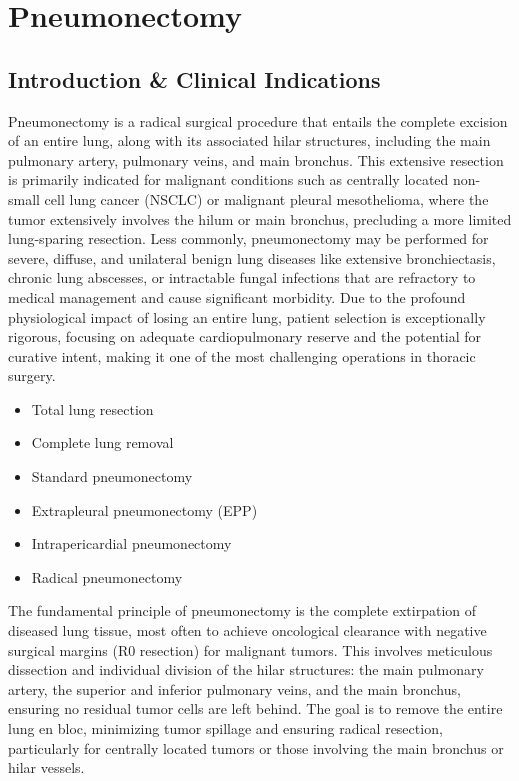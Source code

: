 \chapter{Pneumonectomy}

\section*{Introduction \& Clinical Indications}
Pneumonectomy is a radical surgical procedure that entails the complete excision of an entire lung, along with its associated hilar structures, including the main pulmonary artery, pulmonary veins, and main bronchus. This extensive resection is primarily indicated for malignant conditions such as centrally located non-small cell lung cancer (NSCLC) or malignant pleural mesothelioma, where the tumor extensively involves the hilum or main bronchus, precluding a more limited lung-sparing resection. Less commonly, pneumonectomy may be performed for severe, diffuse, and unilateral benign lung diseases like extensive bronchiectasis, chronic lung abscesses, or intractable fungal infections that are refractory to medical management and cause significant morbidity. Due to the profound physiological impact of losing an entire lung, patient selection is exceptionally rigorous, focusing on adequate cardiopulmonary reserve and the potential for curative intent, making it one of the most challenging operations in thoracic surgery.

\begin{itemize}
  \item Total lung resection
  \item Complete lung removal
  \item Standard pneumonectomy
  \item Extrapleural pneumonectomy (EPP)
  \item Intrapericardial pneumonectomy
  \item Radical pneumonectomy
\end{itemize}

The fundamental principle of pneumonectomy is the complete extirpation of diseased lung tissue, most often to achieve oncological clearance with negative surgical margins (R0 resection) for malignant tumors. This involves meticulous dissection and individual division of the hilar structures: the main pulmonary artery, the superior and inferior pulmonary veins, and the main bronchus, ensuring no residual tumor cells are left behind. The goal is to remove the entire lung en bloc, minimizing tumor spillage and ensuring radical resection, particularly for centrally located tumors or those involving the main bronchus or hilar vessels. 

